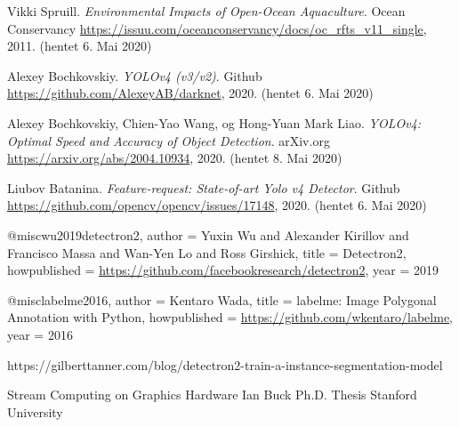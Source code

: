 \documentclass[11ot]{article}
\begin{document}
\begin{thebibliography}{9}
Vikki Spruill.
\textit{Environmental Impacts of Open-Ocean Aquaculture}. 
Ocean Conservancy \url{https://issuu.com/oceanconservancy/docs/oc_rfts_v11_single}, 2011. (hentet 6. Mai 2020)

Alexey Bochkovskiy.
\textit{YOLOv4 (v3/v2)}. 
Github \url{https://github.com/AlexeyAB/darknet}, 2020. (hentet 6. Mai 2020)

Alexey Bochkovskiy, Chien-Yao Wang, og Hong-Yuan Mark Liao.
\textit{YOLOv4: Optimal Speed and Accuracy of Object Detection}. 
arXiv.org \url{https://arxiv.org/abs/2004.10934}, 2020. (hentet 8. Mai 2020)

Liubov Batanina.
\textit{Feature-request: State-of-art Yolo v4 Detector}. 
Github \url{https://github.com/opencv/opencv/issues/17148}, 2020. (hentet 6. Mai 2020)

@misc{wu2019detectron2,
  author =       {Yuxin Wu and Alexander Kirillov and Francisco Massa and
                  Wan-Yen Lo and Ross Girshick},
  title =        {Detectron2},
  howpublished = {\url{https://github.com/facebookresearch/detectron2}},
  year =         {2019}
}

@misc{labelme2016,
  author =       {Kentaro Wada},
  title =        {{labelme: Image Polygonal Annotation with Python}},
  howpublished = {\url{https://github.com/wkentaro/labelme}},
  year =         {2016}
}

https://gilberttanner.com/blog/detectron2-train-a-instance-segmentation-model

Stream Computing on Graphics Hardware
Ian Buck
Ph.D. Thesis
Stanford University

\end{thebibliography}


\end{document}
